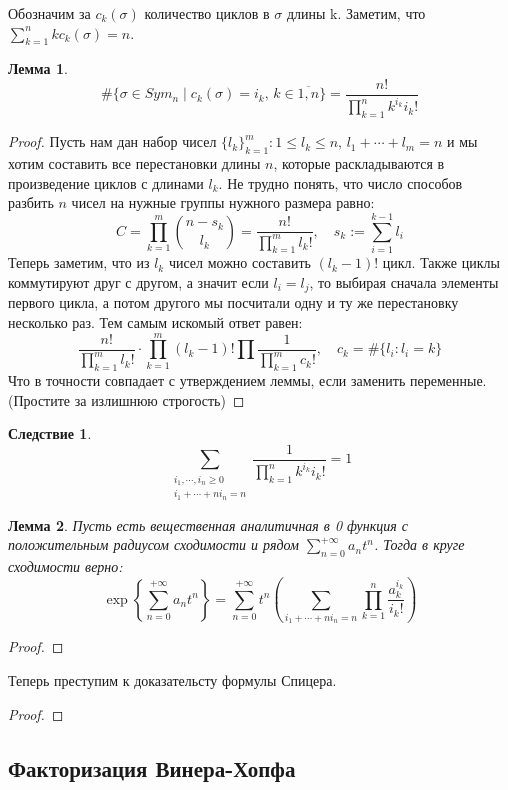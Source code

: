 \documentclass[12pt,a4paper]{article} %
\newtheorem{lemma}{Лемма}
\newtheorem{consequence}{Следствие}
\begin{document}
	Обозначим за $c_k(\sigma)$ количество циклов в $\sigma$ длины k. Заметим, что $\displaystyle\sum_{k=1}^nkc_k(\sigma)=n$.
	\begin{lemma}
		$$\#\{\sigma\in Sym_n\mid c_k(\sigma)=i_k,\,k\in\overline{1,n}\}=\frac{n!}{\prod_{k=1}^nk^{i_k}i_k!}$$
	\end{lemma}
	\begin{proof}
		Пусть нам дан набор чисел $\{l_k\}_{k=1}^m:1\leq l_k\leq n,\,l_1+\cdots+l_m=n$ и мы хотим составить все перестановки длины $n$, которые раскладываются в произведение циклов с длинами $l_k$. Не трудно понять, что число способов разбить $n$ чисел на нужные группы нужного размера равно:
		$$C=\prod_{k=1}^m\binom{n-s_k}{l_k}=\frac{n!}{\prod_{k=1}^ml_k!},\quad s_k:=\sum_{i=1}^{k-1}l_i$$
		Теперь заметим, что из $l_k$ чисел можно составить $(l_k-1)!$ цикл. Также циклы коммутируют друг с другом, а значит если $l_i=l_j$, то выбирая сначала элементы первого цикла, а потом другого мы посчитали одну и ту же перестановку несколько раз. Тем самым искомый ответ равен:
		$$\frac{n!}{\prod_{k=1}^ml_k!}\cdot\prod_{k=1}^m(l_k-1)!\prod\frac{1}{\prod_{k=1}^mc_k!},\quad c_k=\#\{l_i:l_i=k\}$$
		Что в точности совпадает с утверждением леммы, если заменить переменные. (Простите за излишнюю строгость)
	\end{proof}
	\begin{consequence}
		$$\sum_{\substack{i_1,\cdots,i_n\geq0 \\ i_1+\cdots+ni_n=n}}\frac{1}{\prod_{k=1}^nk^{i_k}i_k!}=1$$
	\end{consequence}
	\begin{lemma}
		Пусть есть вещественная аналитичная в 0 функция с положительным радиусом сходимости и рядом $\displaystyle\sum_{n=0}^{+\infty}a_nt^n$. Тогда в круге сходимости верно:
		$$\exp\left\{\sum_{n=0}^{+\infty}a_nt^n\right\}=\sum_{n=0}^{+\infty}t^n\left(\sum_{i_1+\cdots+ni_n=n}\prod_{k=1}^n\frac{a_k^{i_k}}{i_k!}\right)$$
	\end{lemma}
	\begin{proof}
	\end{proof}
	Теперь преступим к доказательсту формулы Спицера.
	\begin{proof}
	\end{proof}
	\subsection{Факторизация Винера-Хопфа}
\end{document}
